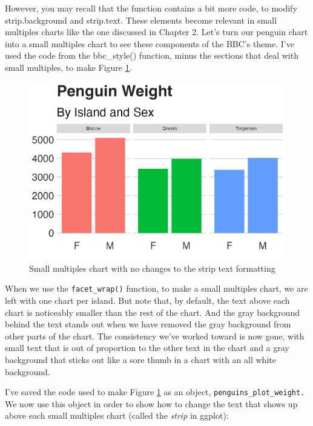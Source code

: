 \documentclass[
]{book}
\begin{document}
However, you may recall that the function contains a bit more code, to modify strip.background and strip.text. These elements become relevant in small multiples charts like the one discussed in Chapter 2. Let's turn our penguin chart into a small multiples chart to see these components of the BBC's theme. I've used the code from the bbc\_style() function, minus the sections that deal with small multiples, to make Figure \ref{fig:penguin-facetted-plot}.

\begin{figure}
\includegraphics[width=1\linewidth]{custom-theme_files/figure-latex/penguin-facetted-plot-1} \caption{Small multiples chart with no changes to the strip text formatting}\label{fig:penguin-facetted-plot}
\end{figure}

When we use the \texttt{facet\_wrap()} function, to make a small multiples chart, we are left with one chart per island. But note that, by default, the text above each chart is noticeably smaller than the rest of the chart. And the gray background behind the text stands out when we have removed the gray background from other parts of the chart. The consistency we've worked toward is now gone, with small text that is out of proportion to the other text in the chart and a gray background that sticks out like a sore thumb in a chart with an all white background.

I've saved the code used to make Figure \ref{fig:penguin-facetted-plot} as an object, \texttt{penguins\_plot\_weight.} We now use this object in order to show how to change the text that shows up above each small multiples chart (called the \emph{strip} in ggplot):
\end{document}
